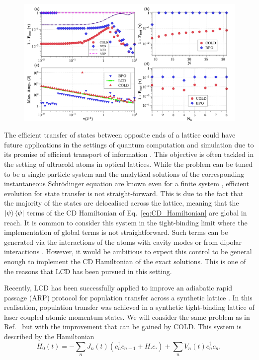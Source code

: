 \begin{figure}[t]
    \centering
    \includegraphics[width=\linewidth]{images/synthetic_lattice.jpg} \caption[COLD plots for ARP transport in a synthetic lattice]{}\label{fig:synthetic_results}
\end{figure}

The efficient transfer of states between opposite ends of a lattice could have future applications in the settings of quantum computation and simulation due to its promise of efficient transport of information \cite{lang_topological_2017}. This objective is often tackled in the setting of ultracold atoms in optical lattices. While the problem can be tuned to be a single-particle system and the analytical solutions of the corresponding instantaneous Schr\"odinger equation are known \cite{hatsugai_chern_1993,hugel_chiral_2014} even for a finite system \cite{duncan_exact_2018}, efficient evolution for state transfer is not straight-forward.  This is due to the fact that the majority of the states are delocalised across the lattice, meaning that the $\ket{\psi}\bra{\psi}$ terms of the CD Hamiltonian of Eq.~\eqref{eq:CD_Hamiltonian} are global in reach. It is common to consider this system in the tight-binding limit where the implementation of global terms is not straightforward. Such terms can be generated via the interactions of the atoms with cavity modes \cite{landig_quantum_2016,keller_phases_2017} or from dipolar interactions \cite{baranov_ultracold_2002, trefzger_ultracold_2011}. However, it would be ambitious to expect this control to be general enough to implement the CD Hamiltonian of the exact solutions.  This is one of the reasons that LCD has been pursued in this setting. 

Recently, LCD has been successfully applied to improve an adiabatic rapid passage (ARP) protocol for population transfer across a synthetic lattice \cite{meier_counterdiabatic_2020}. In this realisation, population transfer was achieved in a synthetic tight-binding lattice of laser coupled atomic momentum states. We will consider the same problem as in Ref.~\cite{meier_counterdiabatic_2020} but with the improvement that can be gained by COLD. This system is described by the Hamiltonian
\begin{equation}\label{eq:lattice_hamiltonian}
    H_0(t) = - \sum_n J_n(t)(c_n^{\dag}c_{n+1} + H.c.) + \sum_n V_n(t) c_n^{\dag}c_n,
\end{equation}

